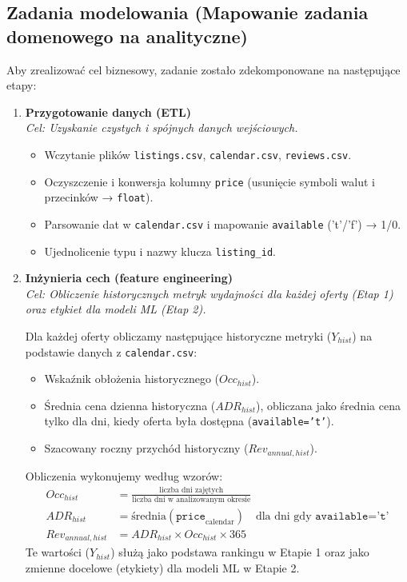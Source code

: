 \documentclass[a4paper,11pt]{article}
\begin{document}
\vspace{0.5cm}

\subsection{Zadania modelowania (Mapowanie zadania domenowego na analityczne)}

Aby zrealizować cel biznesowy, zadanie zostało zdekomponowane na następujące etapy:

\begin{enumerate}[label=\textbf{Zadanie \arabic*.}, leftmargin=*]
  \item \textbf{Przygotowanie danych (ETL)}\\
    \textit{Cel: Uzyskanie czystych i spójnych danych wejściowych.}
    \begin{itemize}[label=$\triangleright$,itemsep=3pt]
      \item Wczytanie plików \texttt{listings.csv}, \texttt{calendar.csv}, \texttt{reviews.csv}.
      \item Oczyszczenie i konwersja kolumny \texttt{price} (usunięcie symboli walut i przecinków → \texttt{float}).
      \item Parsowanie dat w \texttt{calendar.csv} i mapowanie \texttt{available} ('t'/'f') → 1/0.
      \item Ujednolicenie typu i nazwy klucza \texttt{listing\_id}.
    \end{itemize}

  \item \textbf{Inżynieria cech (feature engineering)}\\
    \textit{Cel: Obliczenie historycznych metryk wydajności dla każdej oferty (Etap 1) oraz etykiet dla modeli ML (Etap 2).}

    Dla każdej oferty obliczamy następujące historyczne metryki ($Y_{hist}$) na podstawie danych z \texttt{calendar.csv}:
    \begin{itemize}
        \item Wskaźnik obłożenia historycznego ($Occ_{hist}$).
        \item Średnia cena dzienna historyczna ($ADR_{hist}$), obliczana jako średnia cena tylko dla dni, kiedy oferta była dostępna (\texttt{available='t'}).
        \item Szacowany roczny przychód historyczny ($Rev_{annual, hist}$).
    \end{itemize}
    Obliczenia wykonujemy według wzorów:
    \begin{align*}
      Occ_{hist} &= \frac{\text{liczba dni zajętych}}{\text{liczba dni w analizowanym okresie}} \\
      ADR_{hist} &= \text{średnia}(\texttt{price}_{\text{calendar}}) \quad \text{dla dni gdy } \texttt{available='t'} \\
      Rev_{annual, hist} &= ADR_{hist} \times Occ_{hist} \times 365
    \end{align*}
    Te wartości ($Y_{hist}$) służą jako podstawa rankingu w Etapie 1 oraz jako zmienne docelowe (etykiety) dla modeli ML w Etapie 2.



\end{enumerate}
\end{document}
